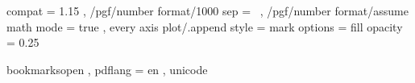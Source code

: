 %

\usepackage{fontspec}
\usepackage{polyglossia}
	\setdefaultlanguage{english}
\usepackage{amsmath}  %
\usepackage[math-style=ISO]{unicode-math}

\usepackage[noend]{algpseudocode}
	\algrenewcommand{}
	\algrenewcommand{}
\usepackage[backend=biber, maxbibnames=42, maxcitenames=42, sorting=ynt, style=authoryear]{biblatex}
\usepackage{csquotes}
\usepackage{mathtools}
\usepackage{media9}
\usepackage{scalerel}
\usepackage{standalone}
\usepackage{tikz}
	\usetikzlibrary{arrows.meta}
	\usetikzlibrary{backgrounds}
	\usetikzlibrary{calc}
	\usetikzlibrary{decorations}
	\usetikzlibrary{decorations.pathmorphing}
	\usetikzlibrary{decorations.pathreplacing}
	\usetikzlibrary{fadings}
	\usetikzlibrary{fit}
	\usetikzlibrary{graphs}
	\usetikzlibrary{graphdrawing}
	\usetikzlibrary{intersections}
	\usetikzlibrary{positioning}
	\usetikzlibrary{quotes}
	\usetikzlibrary{shadows.blur}
	\usetikzlibrary{shapes.arrows}
	\usetikzlibrary{shapes.geometric}
\usepackage{xifthen}
\usepackage{xspace}

\usepackage{pgfplots}
	\pgfplotsset
		{ compat = 1.15
		, /pgf/number format/1000 sep = {\,}
		, /pgf/number format/assume math mode = true
		, every axis plot/.append style =
			{ mark options = {fill opacity = 0.25}
			}
		}
\usepackage{pgfplotstable}

\hypersetup
	{ bookmarksopen
	, pdflang = en
	, unicode
	}







